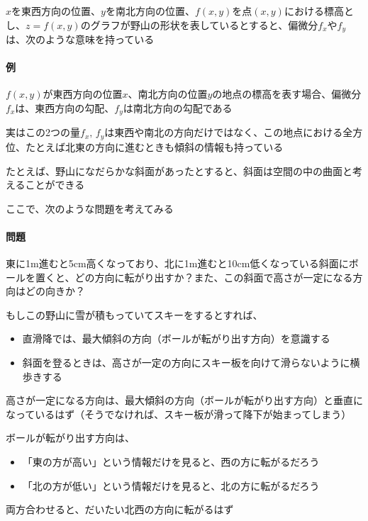 \documentclass[../book_jiriki_calc]{subfiles}
\begin{document}
$x$を東西方向の位置、$y$を南北方向の位置、$f(x,y)$を点$(x,y)$における標高とし、$z=f(x,y)$のグラフが野山の形状を表しているとすると、偏微分$f_x$や$f_y$は、次のような意味を持っている

\sectionline

\paragraph{例}

$f(x,y)$が東西方向の位置$x$、南北方向の位置$y$の地点の標高を表す場合、偏微分$f_x$は、東西方向の勾配、$f_y$は南北方向の勾配である

\sectionline

実はこの2つの量$f_x, \, f_y$は東西や南北の方向だけではなく、この地点における全方位、たとえば北東の方向に進むときも傾斜の情報も持っている

\br

たとえば、野山になだらかな斜面があったとすると、斜面は空間の中の曲面と考えることができる

ここで、次のような問題を考えてみる

\br

\paragraph{問題}
東に1m進むと5cm高くなっており、北に1m進むと10cm低くなっている斜面にボールを置くと、どの方向に転がり出すか？また、この斜面で高さが一定になる方向はどの向きか？

\br

もしこの野山に雪が積もっていてスキーをするとすれば、
\begin{itemize}
  \item 直滑降では、最大傾斜の方向（ボールが転がり出す方向）を意識する
  \item 斜面を登るときは、高さが一定の方向にスキー板を向けて滑らないように横歩きする
\end{itemize}

高さが一定になる方向は、最大傾斜の方向（ボールが転がり出す方向）と垂直になっているはず（そうでなければ、スキー板が滑って降下が始まってしまう）

\br

ボールが転がり出す方向は、
\begin{itemize}
  \item 「東の方が高い」という情報だけを見ると、西の方に転がるだろう
  \item 「北の方が低い」という情報だけを見ると、北の方に転がるだろう
\end{itemize}
両方合わせると、だいたい北西の方向に転がるはず
\end{document}
